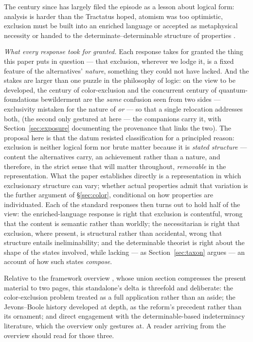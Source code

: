 \documentclass[11pt]{article}
\begin{document}
The century since has largely filed the episode as a lesson about logical form: analysis is harder than the Tractatus hoped, atomism was too optimistic, exclusion must be built into an enriched language or accepted as metaphysical necessity or handed to the determinate--determinable structure of properties \parencite{funkhouser2006}.

\textit{What every response took for granted.} Each response takes for granted the thing this paper puts in question --- that exclusion, wherever we lodge it, is a fixed feature of the alternatives' \emph{nature}, something they could not have lacked. And the stakes are larger than one puzzle in the philosophy of logic: on the view to be developed, the century of color-exclusion and the concurrent century of quantum-foundations bewilderment are the \emph{same} confusion seen from two sides --- exclusivity mistaken for the nature of \emph{or} --- so that a single relocation addresses both, (the second only gestured at here --- the companions carry it, with Section~\ref{sec:exposure} documenting the provenance that links the two). The proposal here is that the datum resisted classification for a principled reason: exclusion is neither logical form nor brute matter because it is \emph{stated structure} --- content the alternatives carry, an achievement rather than a nature, and therefore, in the strict sense that will matter throughout, \emph{removable} in the representation. What the paper establishes directly is a representation in which exclusionary structure can vary; whether actual properties admit that variation is the further argument of \S\ref{sec:color}, conditional on how properties are individuated. Each of the standard responses then turns out to hold half of the view: the enriched-language response is right that exclusion is contentful, wrong that the content is semantic rather than worldly; the necessitarian is right that exclusion, where present, is structural rather than accidental, wrong that structure entails ineliminability; and the determinable theorist is right about the shape of the states involved, while lacking --- as Section~\ref{sec:taxon} argues --- an account of how such states \emph{compose}.



Relative to the framework overview \cite{AethusBrief}, whose union section compresses the present material to two pages, this standalone's delta is threefold and deliberate: the color-exclusion problem treated as a full application rather than an aside; the Jevons--Boole history developed at depth, as the reform's precedent rather than its ornament; and direct engagement with the determinable-based indeterminacy literature, which the overview only gestures at. A reader arriving from the overview should read for those three.
\end{document}
